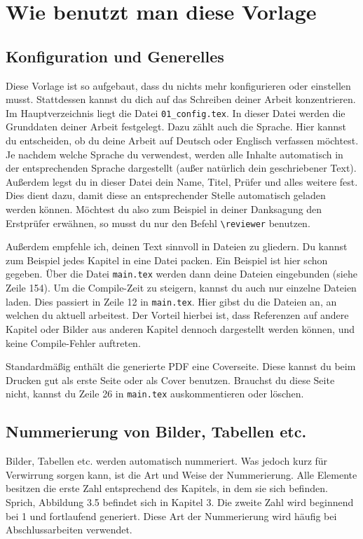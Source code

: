 \section{Wie benutzt man diese Vorlage}
\subsection{Konfiguration und Generelles}
Diese Vorlage ist so aufgebaut, dass du nichts mehr konfigurieren oder einstellen musst.
Stattdessen kannst du dich auf das Schreiben deiner Arbeit konzentrieren.
Im Hauptverzeichnis liegt die Datei \verb|01_config.tex|.
In dieser Datei werden die Grunddaten deiner Arbeit festgelegt.
Dazu zählt auch die Sprache.
Hier kannst du entscheiden, ob du deine Arbeit auf Deutsch oder Englisch verfassen möchtest.
Je nachdem welche Sprache du verwendest, werden alle Inhalte automatisch in der entsprechenden Sprache dargestellt (außer natürlich dein geschriebener Text).
Außerdem legst du in dieser Datei dein Name, Titel, Prüfer und alles weitere fest.
Dies dient dazu, damit diese an entsprechender Stelle automatisch geladen werden können.
Möchtest du also zum Beispiel in deiner Danksagung den Erstprüfer erwähnen, so musst du nur den Befehl \verb|\reviewer| benutzen.

Außerdem empfehle ich, deinen Text sinnvoll in Dateien zu gliedern.
Du kannst zum Beispiel jedes Kapitel in eine Datei packen.
Ein Beispiel ist hier schon gegeben.
Über die Datei \verb|main.tex| werden dann deine Dateien eingebunden (siehe Zeile 154).
Um die Compile-Zeit zu steigern, kannst du auch nur einzelne Dateien laden.
Dies passiert in Zeile 12 in \verb|main.tex|.
Hier gibst du die Dateien an, an welchen du aktuell arbeitest.
Der Vorteil hierbei ist, dass Referenzen auf andere Kapitel oder Bilder aus anderen Kapitel dennoch dargestellt werden können, und keine Compile-Fehler auftreten.

Standardmäßig enthält die generierte PDF eine Coverseite.
Diese kannst du beim Drucken gut als erste Seite oder als Cover benutzen.
Brauchst du diese Seite nicht, kannst du Zeile 26 in \verb|main.tex| auskommentieren oder löschen.



\subsection{Nummerierung von Bilder, Tabellen etc.}
Bilder, Tabellen etc. werden automatisch nummeriert.
Was jedoch kurz für Verwirrung sorgen kann, ist die Art und Weise der Nummerierung.
Alle Elemente besitzen die erste Zahl entsprechend des Kapitels, in dem sie sich befinden.
Sprich, Abbildung 3.5 befindet sich in Kapitel 3.
Die zweite Zahl wird beginnend bei 1 und fortlaufend generiert.
Diese Art der Nummerierung wird häufig bei Abschlussarbeiten verwendet.



